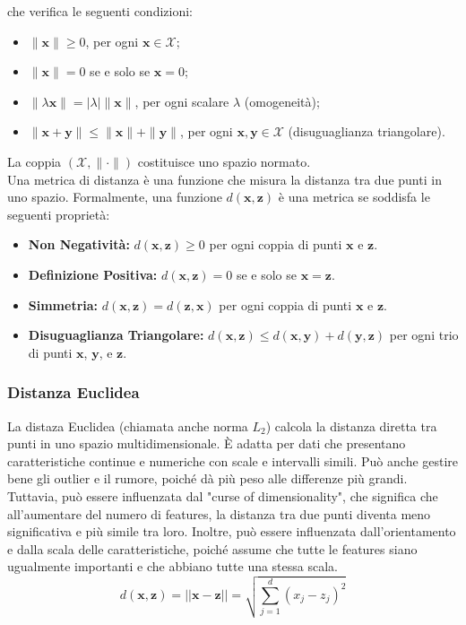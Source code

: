 che verifica le seguenti condizioni:

\begin{itemize}
    \item $\|\mathbf{x}\| \geq 0$, per ogni $\mathbf{x} \in \mathcal{X}$;
    \item $\|\mathbf{x}\| = 0$ se e solo se $\mathbf{x} = 0$;
    \item $\|\lambda \mathbf{x}\| = |\lambda| \|\mathbf{x}\|$, per ogni scalare $\lambda$ (omogeneità);
    \item $\|\mathbf{x} + \mathbf{y}\| \leq \|\mathbf{x}\| + \|\mathbf{y}\|$, per ogni $\mathbf{x}, \mathbf{y} \in \mathcal{X}$ (disuguaglianza triangolare).
\end{itemize}

La coppia $(\mathcal{X}, \|\cdot\|)$ costituisce uno spazio normato.\\

Una metrica di distanza è una funzione che misura la distanza tra due punti in uno spazio. Formalmente, una funzione \( d(\mathbf{x}, \mathbf{z}) \) è una metrica se soddisfa le seguenti proprietà:

\begin{itemize}
    \item \textbf{Non Negatività:} \( d(\mathbf{x}, \mathbf{z}) \geq 0 \) per ogni coppia di punti \( \mathbf{x} \) e \( \mathbf{z} \).
    \item \textbf{Definizione Positiva:} \( d(\mathbf{x}, \mathbf{z}) = 0 \) se e solo se \( \mathbf{x} = \mathbf{z} \).
    \item \textbf{Simmetria:} \( d(\mathbf{x}, \mathbf{z}) = d(\mathbf{z}, \mathbf{x}) \) per ogni coppia di punti \( \mathbf{x} \) e \( \mathbf{z} \).
    \item \textbf{Disuguaglianza Triangolare:} \( d(\mathbf{x}, \mathbf{z}) \leq d(\mathbf{x}, \mathbf{y}) + d(\mathbf{y}, \mathbf{z}) \) per ogni trio di punti \( \mathbf{x} \), \( \mathbf{y} \), e \( \mathbf{z} \).
\end{itemize}

\subsubsection{Distanza Euclidea} 
La distaza Euclidea (chiamata anche norma $L_2$) calcola la distanza diretta tra punti in uno spazio multidimensionale. 
È adatta per dati 
che presentano caratteristiche continue e numeriche con scale e intervalli simili. 
Può anche gestire bene gli outlier e il rumore, poiché dà più peso alle differenze più grandi. 
Tuttavia, può essere influenzata dal "curse of dimensionality", che significa che all'aumentare 
del numero di features, la distanza tra due punti diventa meno significativa e più simile tra loro.
Inoltre, può essere influenzata dall'orientamento e dalla scala delle 
    caratteristiche, poiché assume che tutte le features siano ugualmente 
    importanti e che abbiano tutte una stessa scala.
    \[
    d(\mathbf{x}, \mathbf{z}) = ||\mathbf{x} - \mathbf{z}|| = \sqrt{\sum_{j=1}^d (x_j - z_j)^2}
    \]    

